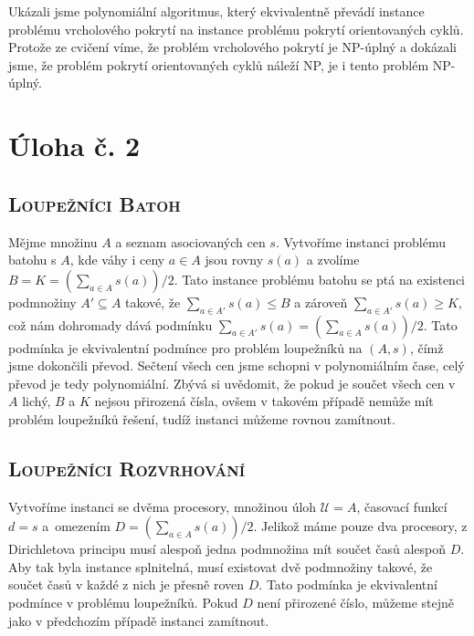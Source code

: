 \documentclass{scrartcl}
\begin{document}
Ukázali jsme polynomiální algoritmus, který ekvivalentně převádí instance problému vrcholového pokrytí na instance problému pokrytí orientovaných cyklů. Protože ze cvičení víme, že problém vrcholového pokrytí je NP-úplný a dokázali jsme, že problém pokrytí orientovaných cyklů náleží NP, je i tento problém NP-úplný.

\section*{Úloha č. 2}
\subsection*{\textsc{Loupežníci \rightarrow Batoh}}
Mějme množinu $A$ a seznam asociovaných cen $s$. Vytvoříme instanci problému batohu s $A$, kde váhy i ceny $a \in A$ jsou rovny $s(a)$ a zvolíme $B = K = \left(\sum_{a \in A} s(a)\right)/2$. Tato instance problému batohu se ptá na existenci podmnožiny $A' \subseteq A$ takové, že $\sum_{a\in A'} s(a) \leq B$ a zároveň $\sum_{a\in A'}s(a) \geq K$, což nám dohromady dává podmínku $\sum_{a\in A'} s(a) = \left(\sum_{a \in A} s(a)\right)/2$. Tato podmínka je ekvivalentní podmínce pro problém loupežníků na $(A,s)$, čímž jsme dokončili převod. Sečtení všech cen jsme schopni v polynomiálním čase, celý převod je tedy polynomiální. Zbývá si uvědomit, že pokud je součet všech cen v $A$ lichý, $B$ a $K$ nejsou přirozená čísla, ovšem v takovém případě nemůže mít problém loupežníků řešení, tudíž instanci můžeme rovnou zamítnout.

\subsection*{\textsc{Loupežníci \rightarrow Rozvrhování}}
Vytvoříme instanci se dvěma procesory, množinou úloh $\mathcal{U} = A$, časovací funkcí $d = s$ a~omezením $D = \left(\sum_{a\in A} s(a)\right)/2$. Jelikož máme pouze dva procesory, z Dirichletova principu musí alespoň jedna podmnožina mít součet časů alespoň $D$. Aby tak byla instance splnitelná, musí existovat dvě podmnožiny takové, že součet časů v každé z nich je přesně roven $D$. Tato podmínka je ekvivalentní podmínce v problému loupežníků. Pokud $D$ není přirozené číslo, můžeme stejně jako v předchozím případě instanci zamítnout.
\end{document}
